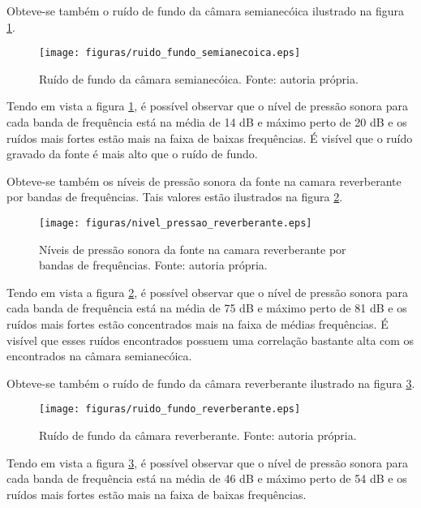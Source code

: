 \newpage
Obteve-se também o ruído de fundo da câmara semianecóica ilustrado na figura \ref{figura_4}.
\begin{figure}[h!]
    \hspace{-4.5cm}
    \texttt{[image: figuras/ruido\_fundo\_semianecoica.eps]}
    \caption{Ruído de fundo da câmara semianecóica. Fonte: autoria própria.}
    \label{figura_4}
\end{figure}

Tendo em vista a figura \ref{figura_4}, é possível observar que o nível de pressão sonora para cada banda de frequência está na média de 14 dB e máximo perto de 20 dB e os ruídos mais fortes estão mais na faixa de baixas frequências. É visível que o ruído gravado da fonte é mais alto que o ruído de fundo.

\newpage
Obteve-se também os níveis de pressão sonora da fonte na camara reverberante por bandas de frequências. Tais valores estão ilustrados na figura \ref{figura_5}.
\begin{figure}[h!]
    \hspace{-4.5cm}
    \texttt{[image: figuras/nivel\_pressao\_reverberante.eps]}
    \caption{Níveis de pressão sonora da fonte na camara reverberante por bandas de frequências. Fonte: autoria própria.}
    \label{figura_5}
\end{figure}

Tendo em vista a figura \ref{figura_5}, é possível observar que o nível de pressão sonora para cada banda de frequência está na média de 75 dB e máximo perto de 81 dB e os ruídos mais fortes estão concentrados mais na faixa de médias frequências. É visível que esses ruídos encontrados possuem uma correlação bastante alta com os encontrados na câmara semianecóica.

\newpage
Obteve-se também o ruído de fundo da câmara reverberante ilustrado na figura \ref{figura_6}.
\begin{figure}[h!]
    \hspace{-4.5cm}
    \texttt{[image: figuras/ruido\_fundo\_reverberante.eps]}
    \caption{Ruído de fundo da câmara reverberante. Fonte: autoria própria.}
    \label{figura_6}
\end{figure}

Tendo em vista a figura \ref{figura_6}, é possível observar que o nível de pressão sonora para cada banda de frequência está na média de 46 dB e máximo perto de 54 dB e os ruídos mais fortes estão mais na faixa de baixas frequências. 

